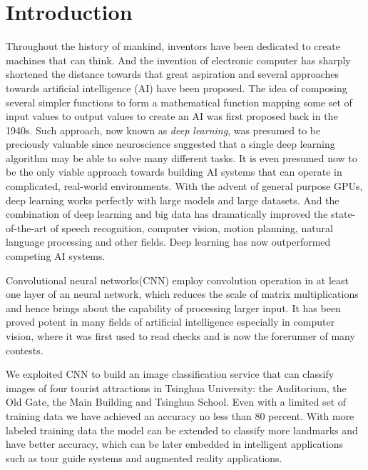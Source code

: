 \section{Introduction}
Throughout the history of mankind, inventors have been dedicated to create machines that can think. And the invention of electronic computer has sharply shortened the distance towards that great aspiration and several approaches towards artificial intelligence (AI) have been proposed. The idea of composing several simpler functions to form a mathematical function mapping some set of input values to output values to create an AI was first proposed back in the 1940s\cite{mcculloch1943logical}. Such approach, now known as \emph{deep learning}, was presumed to be preciously valuable since neuroscience suggested that a single deep learning algorithm may be able to solve many different tasks\cite{von2000visual}. It is even presumed now to be the only viable approach towards building AI systems that can operate in complicated, real-world environments\cite{dlbook}. With the advent of general purpose GPUs, deep learning works perfectly with large models and large datasets. And the combination of deep learning and big data has dramatically improved the state-of-the-art of speech recognition, computer vision, motion planning, natural language processing and other fields\cite{lecun2015deep}. Deep learning has now outperformed competing AI systems\cite{dlbook}.

Convolutional neural networks(CNN)\cite{lecun1989generalization} employ convolution operation in at least one layer of an neural network, which reduces the scale of matrix multiplications and hence brings about the capability of processing larger input. It has been proved potent in many fields of artificial intelligence especially in computer vision, where it was first used to read checks\cite{lecun1998gradient} and is now the forerunner of many contests\cite{krizhevsky2012imagenet}.

We exploited CNN to build an image classification service that can classify images of four tourist attractions in Tsinghua University: the Auditorium, the Old Gate, the Main Building and Tsinghua School. Even with a limited set of training data we have achieved an accuracy no less than 80 percent. With more labeled training data the model can be extended to classify more landmarks and have better accuracy, which can be later embedded in intelligent applications such as tour guide systems and augmented reality applications.
